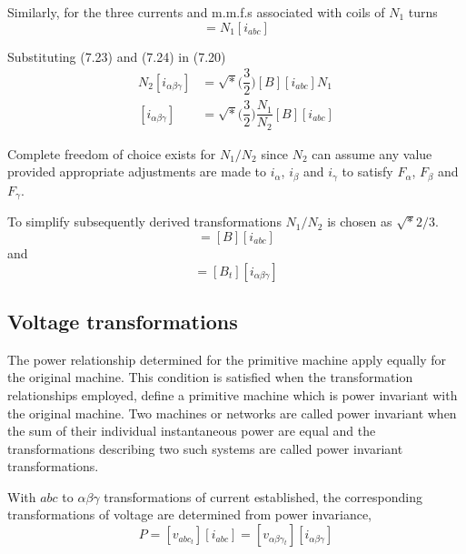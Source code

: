 \documentclass[a4paper,numbers=noenddot,12pt]{scrbook}
\begin{document}
    Similarly, for the three currents and m.m.f.s associated with coils of $N_1$ turns
    \begin{equation}
        [F_{abc}] = N_1 [i_{abc}]
        \label{eq:Eq7.24}
    \end{equation}

    Substituting (7.23) and (7.24)  in (7.20)
    \begin{align}
        N_2[i_{\alpha \beta \gamma}] & = \sqrt*{\Big( \dfrac{3}{2}\Big) } [B] [i_{abc}] N_1 \nonumber \\
        [i_{\alpha \beta \gamma}] & = \sqrt*{\Big( \dfrac{3}{2} \Big) } \dfrac{N_1}{N_2} [B] [i_{abc}]
        \label{eq:Eq7.25}
    \end{align}

    Complete freedom of choice exists for $N_1 / N_2$ since $N_2$ can assume any value provided appropriate adjustments are made to $i_{\alpha}$, $i_{\beta}$ and $i_{\gamma}$ to satisfy $F_{\alpha}$, $F_{\beta}$ and $F_{\gamma}$.

    To simplify subsequently derived transformations $N_1 / N_2$ is chosen as $\sqrt*{2/3}$.
    \begin{equation}
        [i_{\alpha \beta \gamma}] = [B][i_{abc}]
        \label{eq:Eq7.26}
    \end{equation}
    and
    \begin{equation}
        [i_{abc}] = [B_t] [i_{\alpha \beta \gamma}]
        \label{eq:Eq7.27}
    \end{equation}

    \subsection{Voltage transformations}
    The power relationship determined  for the primitive machine apply equally for the original machine. This condition is satisfied when the transformation relationships employed, define a primitive machine which is power invariant with the original machine. Two machines or networks are called power invariant when the sum of their individual instantaneous power are equal and the transformations describing two such systems are called power
    invariant transformations.

    With $abc$ to $\alpha \beta \gamma$ transformations of current established, the corresponding transformations of voltage are determined from power invariance,
    \begin{equation}
        P = [v_{abc_{t}}][i_{abc}] = [v_{\alpha \beta \gamma_{t}}][i_{\alpha \beta \gamma}]
        \label{eq:Eq7.28}
    \end{equation}
\end{document}
